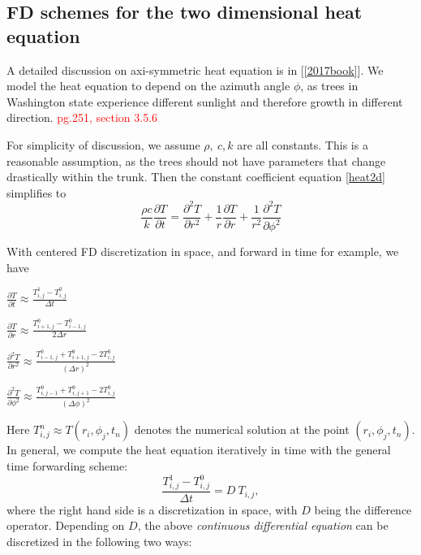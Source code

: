 \documentclass[12pt]{article}
\begin{document}
\subsection{FD schemes for the two dimensional heat equation}
A detailed discussion on axi-symmetric heat equation is in [\ref{2017book}]. We model the heat equation to depend on the azimuth angle $\phi$, as trees in Washington state experience different sunlight and therefore growth in different direction. \textcolor{red}{pg.251, section 3.5.6}

For simplicity of discussion, we assume $\rho,\ c, k$ are all constants. This is a reasonable assumption, as the trees should not have parameters that change drastically within the trunk. Then the constant coefficient equation \eqref{heat2d} simplifies to 
\begin{equation}
\frac{\rho c}{k}\frac{\partial T}{\partial t}=\frac{\partial^2 T}{\partial r^2}+\frac{1}{r}\frac{\partial T}{\partial r}+\frac{1}{r^2}\frac{\partial^2 T}{\partial \phi^2}\label{simple_heat}
\end{equation}

With centered FD discretization in space, and forward in time for example, we have
\begin{itemize}\begin{multicols}{2}
\item $\frac{\partial T}{\partial t}\approx\frac{T^1_{i,j}-T^0_{i,j}}{\Delta t}$
\item $\frac{\partial T}{\partial r}\approx\frac{T^0_{i+1,j}-T^0_{i-1,j}}{2\Delta r}$
\item $\frac{\partial^2 T}{\partial r^2}\approx\frac{T^0_{i-1,j}+T^0_{i+1,j}-2T^0_{i,j}}{(\Delta r)^2}$
\item $\frac{\partial^2 T}{\partial \phi^2}\approx\frac{T^0_{i,j-1}+T^0_{i,j+1}-2T^0_{i,j}}{(\Delta \phi)^2}$
\end{multicols}\end{itemize}

Here $T^n_{i,j} \approx T(r_i,\phi_j,t_n)$ denotes the numerical solution at the point $(r_i,\phi_j,t_n)$. In general, we compute the heat equation iteratively in time with the general time forwarding scheme: 
\begin{equation}
\frac{T^1_{i,j}-T^0_{i,j}}{\Delta t}=D\ T_{i,j},
\end{equation}
where the right hand side is a discretization in space, with $D$ being the difference operator. Depending on $D$, the above {\it continuous differential equation} can be discretized in the following two ways:
\end{document}
